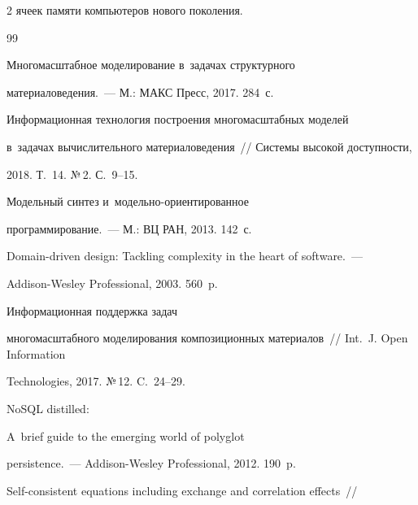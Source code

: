 \begin{multicols}{2}
ячеек памяти компьютеров нового поколения.


  


{\small\frenchspacing


 {%




 \begin{thebibliography}{99}


  




  Многомасштабное моделирование в~задачах структурного 


материаловедения.~--- М.: МАКС Пресс, 2017. 284~с.




  Информационная технология по\-стро\-ения многомасштабных моделей 


в~задачах вычислительного материаловедения~// Системы высокой доступности, 


2018. Т.~14.  №\,2. С.~9--15.




  Модельный синтез и~модельно-ори\-ен\-ти\-ро\-ван\-ное 


 программирование.~--- М.: ВЦ РАН, 2013. 142~с.




  Domain-driven design: Tackling complexity in the heart of software.~--- 


 Addison-Wesley Professional, 2003. 560~p.




  Информационная поддержка задач 


многомасштабного моделирования композиционных материалов~// Int.~J. Open Information 


Technologies, 2017. №\,12. C.~24--29.




  NoSQL distilled: 


 A~brief guide to the emerging world of polyglot 


persistence.~--- Addison-Wesley Professional, 2012. 190~p.




  Self-consistent equations including exchange and correlation effects~// 



\end{thebibliography}}}
\end{multicols}
